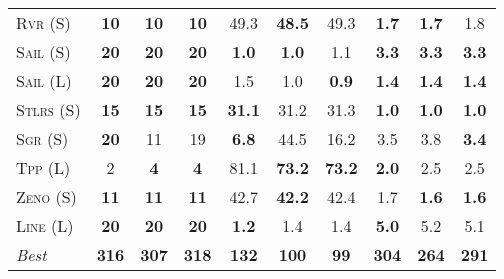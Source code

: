 \documentclass[11pt]{article}
\begin{document}
\begin{table*}[tb]
{\begin{tabular}{|l||ccc||ccc||ccc||}
\textsc{Rvr} (S)&\textbf{10}&\textbf{10}&\textbf{10}&49.3&\textbf{48.5}&49.3&\textbf{1.7}&\textbf{1.7}&1.8\\
\textsc{Sail} (S)&\textbf{20}&\textbf{20}&\textbf{20}&\textbf{1.0}&\textbf{1.0}&1.1&\textbf{3.3}&\textbf{3.3}&\textbf{3.3}\\
\textsc{Sail} (L)&\textbf{20}&\textbf{20}&\textbf{20}&1.5&1.0&\textbf{0.9}&\textbf{1.4}&\textbf{1.4}&\textbf{1.4}\\
\textsc{Stlrs} (S)&\textbf{15}&\textbf{15}&\textbf{15}&\textbf{31.1}&31.2&31.3&\textbf{1.0}&\textbf{1.0}&\textbf{1.0}\\
\textsc{Sgr} (S)&\textbf{20}&11&19&\textbf{6.8}&44.5&16.2&3.5&3.8&\textbf{3.4}\\
\textsc{Tpp} (L)&2&\textbf{4}&\textbf{4}&81.1&\textbf{73.2}&\textbf{73.2}&\textbf{2.0}&2.5&2.5\\
\textsc{Zeno} (S)&\textbf{11}&\textbf{11}&\textbf{11}&42.7&\textbf{42.2}&42.4&1.7&\textbf{1.6}&\textbf{1.6}\\
\textsc{Line} (L)&\textbf{20}&\textbf{20}&\textbf{20}&\textbf{1.2}&1.4&1.4&\textbf{5.0}&5.2&5.1
\\\hline
\textit{Best}&\textbf{316}&\textbf{307}&\textbf{318}&\textbf{132}&\textbf{100}&\textbf{99}&\textbf{304}&\textbf{264}&\textbf{291}\\\hline

        \end{tabular}}
        \caption{}
        \label{tab:all-patty}
        \end{table*}
        
\end{document}
